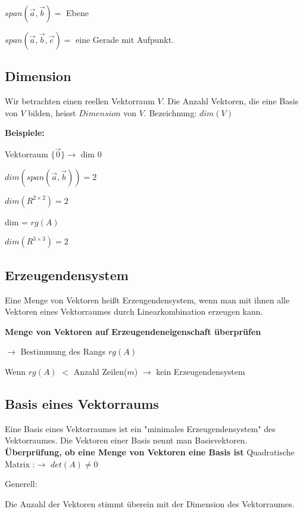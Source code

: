\begin{multicols*}{3}
    {$span(\vec{a},\vec{b}) = $ Ebene}

    {$span(\vec{a},\vec{b},\vec{c}) = $ eine Gerade mit Aufpunkt.}


    \subsection{Dimension}
    { Wir betrachten einen reellen Vektorraum $V$.
        Die Anzahl Vektoren, die eine Basis von $V$ bilden, heisst $Dimension$ von $V$.
    }
    {Bezeichnung: $dim(V)$}

    {\textbf{Beispiele:} }
    \begin{multicols}{2}
        {Vektorraum $\{ \vec{0} \} \rightarrow $ dim $0$}

        {$dim(span(\vec{a},\vec{b})) = 2$}

        {$dim(R^{2 \times 2})=2$}
        \columnbreak

        {dim = $rg(A)$}

        {$dim(R^{3 \times 3})=2$}

    \end{multicols}




    \subsection{Erzeugendensystem}
    {Eine Menge von Vektoren heißt Erzeugendensystem, wenn man mit ihnen alle Vektoren eines Vektorraumes durch Linearkombination erzeugen kann.}

    {\textbf{Menge von Vektoren auf Erzeugendeneigenschaft überprüfen}}

    {$\rightarrow$ Bestimmung des Rangs $rg(A)$}

    {Wenn $rg(A)$ $<$ Anzahl Zeilen($m$) $\rightarrow$ kein Erzeugendensystem}


    \subsection{Basis eines Vektorraums}
    {Eine Basis eines Vektorraumes ist ein "minimales Erzeugendensystem" des Vektorraumes. Die Vektoren einer Basis nennt man Basisvektoren.}
    {\textbf{Überprüfung, ob eine Menge von Vektoren eine Basis ist}}
    {Quadratische Matrix :$\rightarrow$ $det(A) \neq 0$}

    {Generell:}

    { Die Anzahl der Vektoren stimmt überein mit der Dimension des Vektorraumes.}


\end{multicols*}
